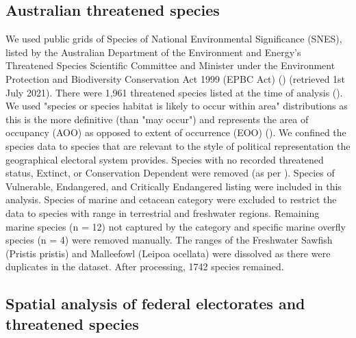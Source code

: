 \documentclass[a4paper,11pt]{article}
\begin{document}
\subsection{Australian threatened species}

We used public grids of Species of National Environmental Significance (SNES), listed by the Australian Department of the Environment and Energy’s Threatened Species Scientific Committee and Minister under the Environment Protection and Biodiversity Conservation Act 1999 (EPBC Act) (\cite{commonwealthofaustraliaThreatenedSpeciesEPBC2021}) (retrieved 1st July 2021). There were 1,961 threatened species listed at the time of analysis (\cite{commonwealthofaustraliaThreatenedSpeciesEPBC2021}). We used "species or species habitat is likely to occur within area" distributions as this is the more definitive (than "may occur") and represents the area of occupancy (AOO) as opposed to extent of occurrence (EOO) (\cite{gastonSizesSpeciesGeographic2009, lloydEstimatingSpatialCoverage2020}). We confined the species data to species that are relevant to the style of political representation the geographical electoral system provides. Species with no recorded threatened status, Extinct, or Conservation Dependent were removed (as per \cite{wardNationalscaleDatasetThreats}). Species of Vulnerable, Endangered, and Critically Endangered listing were included in this analysis. Species of marine and cetacean category were excluded to restrict the data to species with range in terrestrial and freshwater regions. Remaining marine species (n = 12) not captured by the category and specific marine overfly species (n = 4) were removed manually. The ranges of the Freshwater Sawfish (Pristis pristis) and Malleefowl (Leipoa ocellata) were dissolved as there were duplicates in the dataset. After processing, 1742 species remained.

\subsection{Spatial analysis of federal electorates and threatened species}
\end{document}
